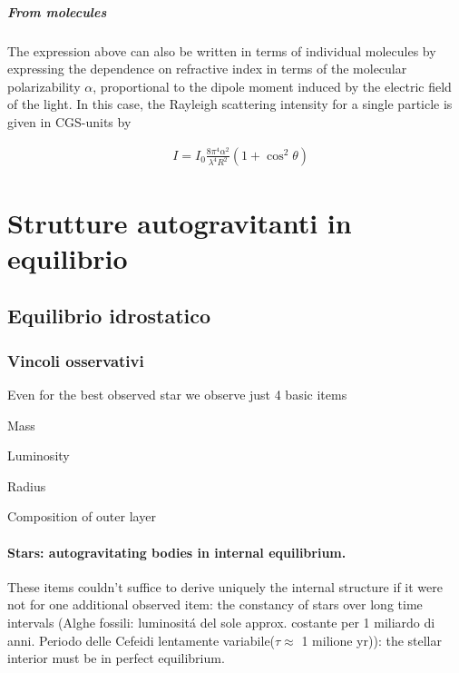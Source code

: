 \documentclass[oneside,12pt,fleqn]{memoir}
\begin{document}
\subsubsection{From molecules}

The expression above can also be written in terms of individual molecules by expressing the dependence on refractive index in terms of the molecular polarizability $\alpha$, proportional to the dipole moment induced by the electric field of the light. In this case, the Rayleigh scattering intensity for a single particle is given in CGS-units by

\begin{align*}
&I=I_0\frac{8\pi^4\alpha^2}{\lambda^4R^2}(1+\cos^2{\theta})
\end{align*}

\part{Strutture autogravitanti in equilibrio}


\chapter{Equilibrio idrostatico}
\PartialToc

\section{Vincoli osservativi}
Even for the best observed star we observe just 4 basic items

\begin{itemize*}
\item Mass
\item Luminosity
\item Radius
\item  Composition of outer layer
\end{itemize*}

\subsection{Stars: autogravitating bodies in internal equilibrium.}
These items couldn't suffice to derive uniquely the internal structure if it were not for one additional observed item: the constancy of stars over long time intervals (Alghe fossili: luminosit\'a del sole approx. costante per 1 miliardo di anni. Periodo delle Cefeidi lentamente variabile($\tau\approx$ 1 milione yr)): the stellar interior must be in perfect equilibrium.
\end{document}
